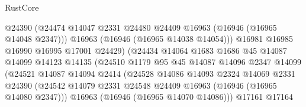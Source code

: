 \begin{lexlean}{RustCore}
\begin{coremodule}
                                      @24390
                                      (@24474
                                        @14047
                                        @2331
                                        @24480
                                        @24409
                                        @16963
                                        (@16946 (@16965 @14048 @2347)))
                                      @16963
                                      (@16946 (@16965 @14038 @14054)))
                                    @16981
                                    @16985
                                    @16990
                                    @16995
                                    @17001
                                    @24429)
                                  (@24434
                                    @14064
                                    @1683
                                    @1686
                                    @45
                                    @14087
                                    @14099
                                    @14123
                                    @14135
                                    (@24510
                                      @1179
                                      @95
                                      @45
                                      @14087
                                      @14096
                                      @2347
                                      @14099
                                      (@24521
                                        @14087
                                        @14094
                                        @2414
                                        (@24528
                                          @14086
                                          @14093
                                          @2324
                                          @14069
                                          @2331
                                          @24390
                                          (@24542
                                            @14079
                                            @2331
                                            @24548
                                            @24409
                                            @16963
                                            (@16946 (@16965 @14080 @2347)))
                                          @16963
                                          (@16946 (@16965 @14070 @14086)))
                                        @17161
                                        @17164

\end{coremodule}
\end{lexlean}
